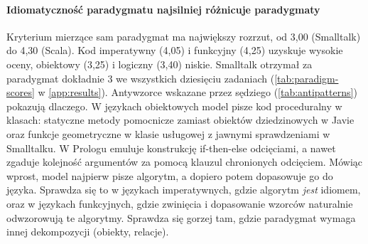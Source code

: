 \paragraph{Idiomatyczność paradygmatu najsilniej różnicuje paradygmaty} Kryterium mierzące sam
paradygmat ma największy rozrzut, od 3,00 (Smalltalk) do 4,30 (Scala). Kod imperatywny (4,05)
i funkcyjny (4,25) uzyskuje wysokie oceny, obiektowy (3,25) i logiczny (3,40) niskie. Smalltalk
otrzymał za paradygmat dokładnie 3 we wszystkich dziesięciu zadaniach (\cref{tab:paradigm-scores}
w \cref{app:results}). Antywzorce wskazane przez sędziego (\cref{tab:antipatterns}) pokazują
dlaczego. W językach obiektowych model pisze kod proceduralny w klasach: statyczne metody pomocnicze
zamiast obiektów dziedzinowych w Javie oraz funkcje geometryczne w klasie usługowej z jawnymi
sprawdzeniami  w Smalltalku. W Prologu emuluje konstrukcję
if-then-else odcięciami, a nawet zgaduje kolejność argumentów za pomocą klauzul chronionych
odcięciem. Mówiąc wprost, model najpierw pisze algorytm, a dopiero potem dopasowuje go do języka.
Sprawdza się to w językach imperatywnych, gdzie algorytm \emph{jest} idiomem, oraz w językach
funkcyjnych, gdzie zwinięcia i dopasowanie wzorców naturalnie odwzorowują te algorytmy. Sprawdza
się gorzej tam, gdzie paradygmat wymaga innej dekompozycji (obiekty, relacje).

